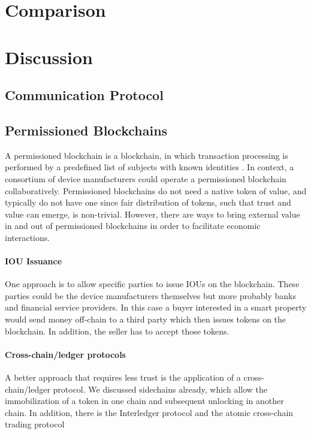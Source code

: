 \section{Comparison}



\section{Discussion}

\subsection{Communication Protocol}

\subsection{Permissioned Blockchains}

A permissioned blockchain is a blockchain, in which transaction processing is performed
by a predefined list of subjects with known identities \cite{BitFuryPermissioned2015}. In context, a consortium of device manufacturers could operate a permissioned blockchain collaboratively. Permissioned blockchains do not need a native token of value, and typically do not have one since fair distribution of tokens, such that trust and value can emerge, is non-trivial. However, there are ways to bring external value in and out of permissioned blockchains in order to facilitate economic interactions. 
\paragraph{IOU Issuance}
One approach is to allow specific parties to issue IOUs on the blockchain. These parties could be the device manufacturers themselves but more probably banks and financial service providers. In this case a buyer interested in a smart property would send money off-chain to a third party which then issues tokens on the blockchain. In addition, the seller has to accept those tokens. 

\paragraph{Cross-chain/ledger protocols}
A better approach that requires less trust is the application of a cross-chain/ledger protocol. We discussed sidechains already, which allow the immobilization of a token in one chain and subsequent unlocking in another chain. In addition, there is the Interledger protocol \cite{hope2016interledger} and the atomic cross-chain trading protocol \cite{atomiccrosschaintrading}

